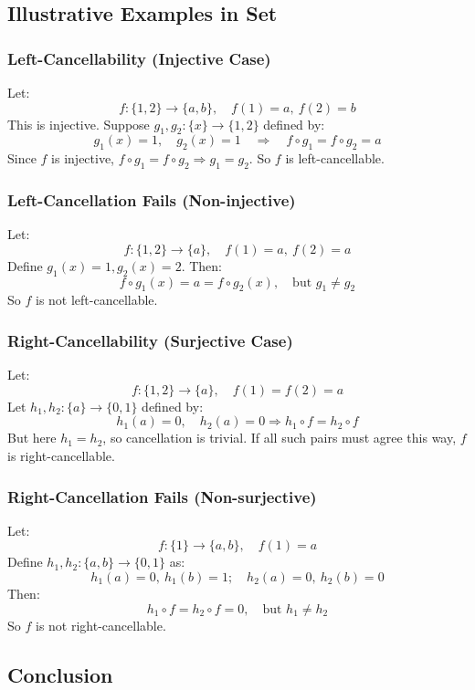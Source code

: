 \documentclass[10pt]{article}
\theoremstyle{plain}
\theoremstyle{definition}
\begin{document}
\subsection*{Illustrative Examples in \textbf{Set}}

\subsubsection*{Left-Cancellability (Injective Case)}

Let:
\[
f : \{1,2\} \to \{a,b\}, \quad f(1) = a,\ f(2) = b
\]
This is injective. Suppose \( g_1, g_2: \{x\} \to \{1,2\} \) defined by:
\[
g_1(x) = 1, \quad g_2(x) = 1 \quad \Rightarrow \quad f \circ g_1 = f \circ g_2 = a
\]
Since \( f \) is injective, \( f \circ g_1 = f \circ g_2 \Rightarrow g_1 = g_2 \). So \( f \) is left-cancellable.

\subsubsection*{Left-Cancellation Fails (Non-injective)}

Let:
\[
f : \{1,2\} \to \{a\}, \quad f(1) = a,\ f(2) = a
\]
Define \( g_1(x) = 1, g_2(x) = 2 \). Then:
\[
f \circ g_1(x) = a = f \circ g_2(x), \quad \text{but } g_1 \neq g_2
\]
So \( f \) is not left-cancellable.

\subsubsection*{Right-Cancellability (Surjective Case)}

Let:
\[
f: \{1,2\} \to \{a\}, \quad f(1) = f(2) = a
\]
Let \( h_1, h_2: \{a\} \to \{0,1\} \) defined by:
\[
h_1(a) = 0, \quad h_2(a) = 0 \Rightarrow h_1 \circ f = h_2 \circ f
\]
But here \( h_1 = h_2 \), so cancellation is trivial. If all such pairs must agree this way, \( f \) is right-cancellable.

\subsubsection*{Right-Cancellation Fails (Non-surjective)}

Let:
\[
f : \{1\} \to \{a,b\}, \quad f(1) = a
\]
Define \( h_1, h_2: \{a,b\} \to \{0,1\} \) as:
\[
h_1(a) = 0,\ h_1(b) = 1; \quad h_2(a) = 0,\ h_2(b) = 0
\]
Then:
\[
h_1 \circ f = h_2 \circ f = 0, \quad \text{but } h_1 \neq h_2
\]
So \( f \) is not right-cancellable.

\subsection*{Conclusion}
\end{document}
